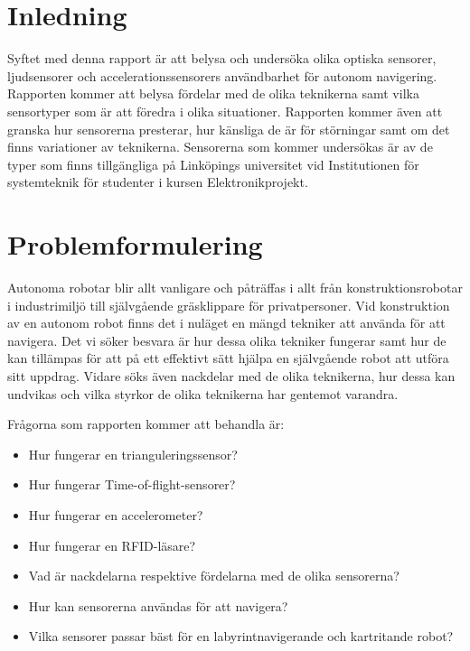\documentclass[a4paper,12pt,fleqn]{article}
\begin{document}
\addto\captionsswedish{\renewcommand{\contentsname}{Innehållsförteckning}}

\tableofcontents
\thispagestyle{fancy}
\newpage

\section{Inledning}
Syftet med denna rapport är att belysa och undersöka olika optiska sensorer, ljudsensorer och accelerationssensorers användbarhet för autonom navigering.
Rapporten kommer att belysa fördelar med de olika teknikerna samt vilka sensortyper som är att föredra i olika situationer.
Rapporten kommer även att granska hur sensorerna presterar, hur känsliga de är för störningar samt om det finns variationer av teknikerna.
Sensorerna som kommer undersökas är av de typer som finns tillgängliga på Linköpings universitet vid Institutionen för systemteknik för studenter i kursen Elektronikprojekt.


\section{Problemformulering}
Autonoma robotar blir allt vanligare och påträffas i allt från konstruktionsrobotar i industrimiljö till självgående gräsklippare för privatpersoner.
Vid konstruktion av en autonom robot finns det i nuläget  en mängd tekniker att använda för att navigera. Det vi söker besvara är hur dessa olika tekniker fungerar samt hur de kan tillämpas för att på ett effektivt sätt hjälpa en självgående robot att utföra sitt uppdrag.
Vidare söks även nackdelar med de olika teknikerna, hur dessa kan undvikas och vilka styrkor de olika teknikerna har gentemot varandra.

Frågorna som rapporten kommer att behandla är:
\begin{itemize}

\item Hur fungerar en trianguleringssensor? 

\item Hur fungerar Time-of-flight-sensorer?

\item Hur fungerar en accelerometer? 

\item Hur fungerar en RFID-läsare?

\item Vad är nackdelarna respektive fördelarna med de olika sensorerna?

\item Hur kan sensorerna användas för att navigera?
\item Vilka sensorer passar bäst för en labyrintnavigerande och kartritande robot?
\end{itemize}
\end{document}
